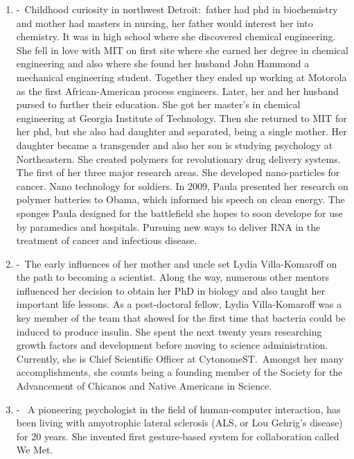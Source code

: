 \documentclass[12pt,a4paper]{article}
\begin{document}
\begin{enumerate}
    \item {} -\ Childhood curiosity in northwest Detroit:\ father had phd in biochemistry and mother had masters in nursing, her father would interest her into chemistry. It was in high school where she discovered chemical engineering. She fell in love with MIT on first site where she earned her degree in chemical engineering and also where she found her husband John Hammond a mechanical engineering student. Together they ended up working at Motorola as the first African-American process engineers. Later, her and her husband pursed to further their education. She got her master's in chemical engineering at Georgia Institute of Technology. Then she returned to MIT for her phd, but she also had daughter and separated, being a single mother. Her daughter became a transgender and also her son is studying psychology at Northeastern. She created polymers for revolutionary drug delivery systems. The first of her three major research areas. She developed nano-particles for cancer. Nano technology for soldiers. In 2009, Paula presented her research on polymer batteries to Obama, which informed his speech on clean energy. The sponges Paula designed for the battlefield she hopes to soon develope for use by paramedics and hospitals. Pursuing new ways to deliver RNA in the treatment of cancer and infectious disease.
    \item {} -\ The early influences of her mother and uncle set Lydia Villa-Komaroff on the path to becoming a scientist. Along the way, numerous other mentors influenced her decision to obtain her PhD in biology and also taught her important life lessons. As a post-doctoral fellow, Lydia Villa-Komaroff was a key member of the team that showed for the first time that bacteria could be induced to produce insulin. She spent the next twenty years researching growth factors and development before moving to science administration. Currently, she is Chief Scientific Officer at CytonomeST.\ Amongst her many accomplishments, she counts being a founding member of the Society for the Advancement of Chicanos and Native Americans in Science. 
    \item {} -\  A pioneering psychologist in the field of human-computer interaction, has been living with amyotrophic lateral sclerosis (ALS, or Lou Gehrig's disease) for 20 years. She invented first gesture-based system for collaboration called We Met.

\end{enumerate}
\end{document}
